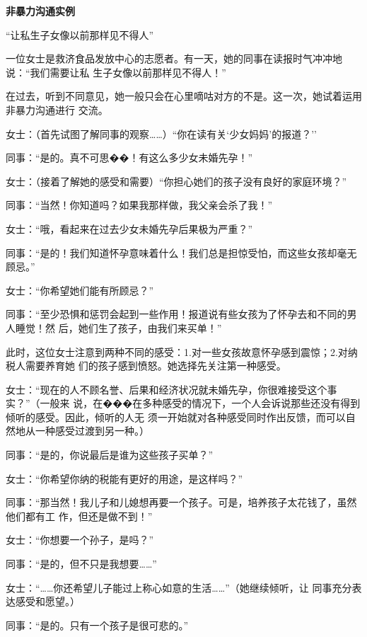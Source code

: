 \documentclass{ctexart}
\renewenvironment{quotation}{\setlength{\parskip}{0.5em}\setstretch{1.5}\kaishu\zihao{-5}\setlength{\parindent}{1em}}{\vspace{1em}}
\begin{document}
\textbf{非暴力沟通实例}

``让私生子女像以前那样见不得人''

一位女士是救济食品发放中心的志愿者。有一天，她的同事在读报时气冲冲地说：``我们需要让私
生子女像以前那样见不得人！''

在过去，听到不同意见，她一般只会在心里嘀咕对方的不是。这一次，她试着运用非暴力沟通进行
交流。

\begin{quotation}
	女士：（首先试图了解同事的观察\ldots\ldots）``你在读有关`少女妈妈'的报道？''

	同事：``是的。真不可思��！有这么多少女未婚先孕！''

	女士：（接着了解她的感受和需要）``你担心她们的孩子没有良好的家庭环境？''

	同事：``当然！你知道吗？如果我那样做，我父亲会杀了我！''

	女士：``哦，看起来在过去少女未婚先孕后果极为严重？''

	同事：``是的！我们知道怀孕意味着什么！我们总是担惊受怕，而这些女孩却毫无顾忌。''

	女士：``你希望她们能有所顾忌？''

	同事：``至少恐惧和惩罚会起到一些作用！报道说有些女孩为了怀孕去和不同的男人睡觉！然
	后，她们生了孩子，由我们来买单！''
\end{quotation}

此时，这位女士注意到两种不同的感受：1.对一些女孩故意怀孕感到震惊；2.对纳税人需要养育她
们的孩子感到愤怒。她选择先关注第一种感受。

\begin{quotation}
	女士：``现在的人不顾名誉、后果和经济状况就未婚先孕，你很难接受这个事实？''（一般来
	说，在���在多种感受的情况下，一个人会诉说那些还没有得到倾听的感受。因此，倾听的人无
	须一开始就对各种感受同时作出反馈，而可以自然地从一种感受过渡到另一种。）

	同事：``是的，你说最后是谁为这些孩子买单？''

	女士：``你希望你纳的税能有更好的用途，是这样吗？''

	同事：``那当然！我儿子和儿媳想再要一个孩子。可是，培养孩子太花钱了，虽然他们都有工
	作，但还是做不到！''

	女士：``你想要一个孙子，是吗？''

	同事：``是的，但不只是我想要\ldots\ldots''

	女士：``\ldots\ldots 你还希望儿子能过上称心如意的生活\ldots\ldots''（她继续倾听，让
	同事充分表达感受和愿望。）

	同事：``是的。只有一个孩子是很可悲的。''
\end{quotation}
\end{document}
